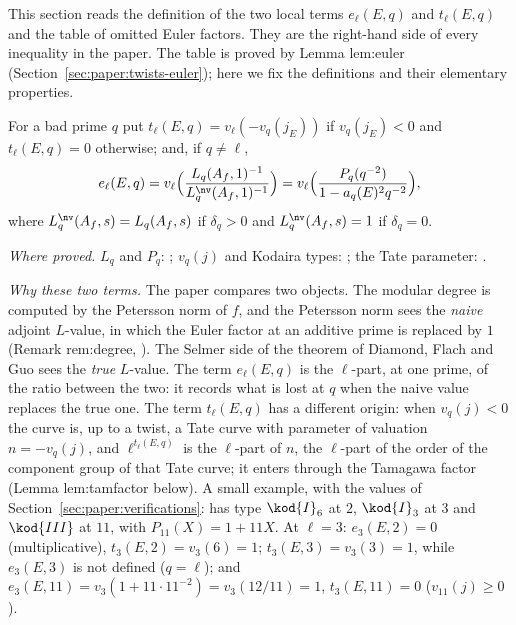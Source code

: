 \begin{sloppypar}
This section reads the definition of the two local terms $e_\ell(E,q)$ and $t_\ell(E,q)$ and the table of omitted Euler factors. They are the
right-hand side of every inequality in the paper. The table is proved by Lemma lem:euler (Section~\ref{sec:paper:twists-euler}); here we fix the
definitions and their elementary properties.

\begin{definition}\label{def:paper:terms}
For a bad prime $q$ put $t_\ell(E,q)=v_\ell(-v_q(j_E))$ if $v_q(j_E)<0$ and $t_\ell(E,q)=0$ otherwise; and, if $q\ne\ell$,
\[
e_\ell(E,q)=v_\ell\Bigl(\frac{L_q(A_f,1)^{-1}}{L^{\nv}_q(A_f,1)^{-1}}\Bigr)=v_\ell\Bigl(\frac{P_q(q^{-2})}{1-a_q(E)^2q^{-2}}\Bigr),
\]
where $L^{\nv}_q(A_f,s)=L_q(A_f,s)$ if $\delta_q>0$ and $L^{\nv}_q(A_f,s)=1$ if $\delta_q=0$.
\end{definition}

\noindent\emph{Where proved.} $L_q$ and $P_q$: ; $v_q(j)$ and Kodaira types: ; the Tate parameter: .

\emph{Why these two terms.} The paper compares two objects. The modular degree is computed by the Petersson norm of $f$, and the Petersson norm sees the
\emph{naive} adjoint $L$-value, in which the Euler factor at an additive prime is replaced by $1$ (Remark rem:degree, ). The Selmer side of
the theorem of Diamond, Flach and Guo sees the \emph{true} $L$-value. The term $e_\ell(E,q)$ is the $\ell$-part, at one prime, of the ratio between the two: it records what
is lost at $q$ when the naive value replaces the true one. The term $t_\ell(E,q)$ has a different origin: when $v_q(j)<0$ the curve is, up to a twist, a Tate curve with
parameter of valuation $n=-v_q(j)$, and $\ell^{t_\ell(E,q)}$ is the $\ell$-part of $n$, the $\ell$-part of the order of the component group of that Tate curve; it enters through
the Tamagawa factor (Lemma lem:tamfactor below). A small example, with the values of Section~\ref{sec:paper:verifications}:  has type $\kod{I}_6$ at $2$, $\kod{I}_3$
at $3$ and $\kod{III}$ at $11$, with $P_{11}(X)=1+11X$. At $\ell=3$: $e_3(E,2)=0$ (multiplicative), $t_3(E,2)=v_3(6)=1$; $t_3(E,3)=v_3(3)=1$, while $e_3(E,3)$ is not defined
($q=\ell$); and $e_3(E,11)=v_3(1+11\cdot11^{-2})=v_3(12/11)=1$, $t_3(E,11)=0$ ($v_{11}(j)\ge0$).


\end{sloppypar}
